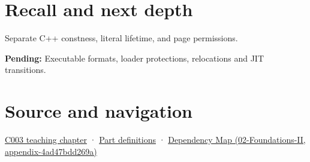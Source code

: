 \section{Recall and next depth}\label{appendix-5f9e5e2f0a5e-recall-and-next-depth}

Separate C++ constness, literal lifetime, and page permissions.

\textbf{Pending:} Executable formats, loader protections, relocations and JIT transitions.

\section{Source and navigation}\label{appendix-5f9e5e2f0a5e-source-and-navigation}

\href{Continuous\%20Notes/Computing\%20Foundations\%20-\%20From\%20Bits\%20to\%20C++\%20and\%20Systems\%20APIs\#Where\%20the\%20bytes\%20live}{C003 teaching chapter} · \hyperref[appendix-fd090d982a15-m003---parts-41-60]{Part definitions} · \href{../02-Foundations-II/main.pdf\#nameddest=appendix-4ad47bdd269a}{Dependency Map (02-Foundations-II, appendix-4ad47bdd269a)}
